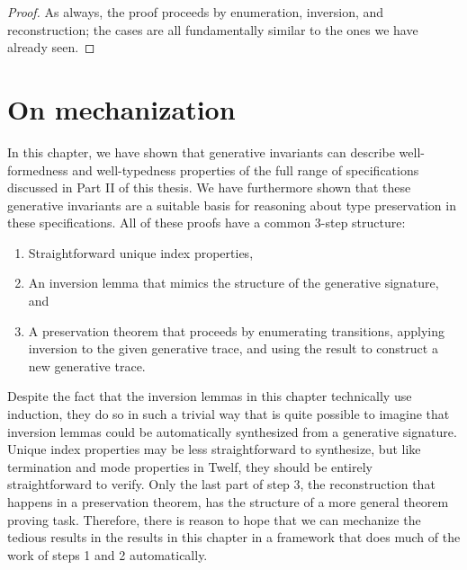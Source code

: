 \begin{proof}
  As always, the proof proceeds by enumeration, inversion, and
  reconstruction; the cases are all fundamentally similar to the ones
  we have already seen.
\end{proof}


\section{On mechanization}

In this chapter, we have shown that generative invariants can describe
well-formedness and well-typedness properties of the full range of
specifications discussed in Part II of this thesis. We have
furthermore shown that these generative invariants are a suitable
basis for reasoning about type preservation in these specifications.
All of these proofs have a common 3-step structure: 

\smallskip
\begin{enumerate}
\item Straightforward unique index properties,
\item An inversion lemma that mimics the
  structure of the generative signature, and
\item A preservation theorem that proceeds by enumerating transitions,
applying inversion to the given generative trace, and using the result
to construct a new generative trace.
\end{enumerate}
\smallskip

\noindent
Despite the fact that the inversion lemmas in this chapter technically
use induction, they do so in such a trivial way that is quite possible
to imagine that inversion lemmas could be automatically synthesized
from a generative signature. Unique index properties may be less
straightforward to synthesize, but like termination and mode
properties in Twelf, they should be entirely straightforward to
verify. Only the last part of step 3, the reconstruction that happens
in a preservation theorem, has the structure of a more general theorem
proving task. Therefore, there is reason to hope that we can mechanize the
tedious results in the results in this chapter in a framework that
does much of the work of steps 1 and 2 automatically.




